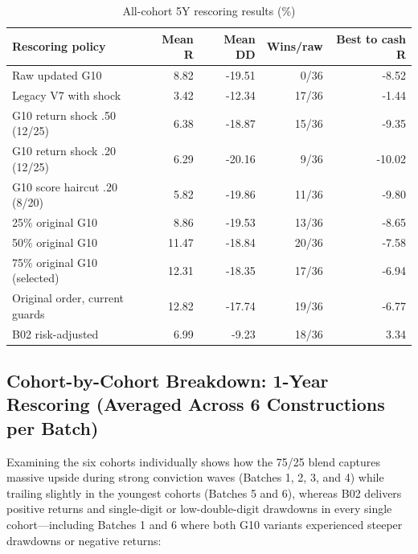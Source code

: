 \documentclass[11pt,a4paper]{article}
\numberwithin{table}{section}
\begin{document}
\begin{minipage}{\linewidth}
\begin{center}\small\setlength{\tabcolsep}{3pt}\renewcommand{\arraystretch}{1.18}
\begin{longtable}{@{}p{.43\linewidth}rrrr@{}}
\caption{All-cohort 5Y rescoring results (\%)}\\
\toprule
Rescoring policy & Mean R & Mean DD & Wins/raw & Best to cash R\\\midrule\endhead
Raw updated G10 & 8.82 & -19.51 & 0/36 & -8.52\\
Legacy V7 with shock & 3.42 & -12.34 & 17/36 & -1.44\\
G10 return shock .50 (12/25) & 6.38 & -18.87 & 15/36 & -9.35\\
G10 return shock .20 (12/25) & 6.29 & -20.16 & 9/36 & -10.02\\
G10 score haircut .20 (8/20) & 5.82 & -19.86 & 11/36 & -9.80\\
25\% original G10 & 8.86 & -19.53 & 13/36 & -8.65\\
50\% original G10 & 11.47 & -18.84 & 20/36 & -7.58\\
75\% original G10 (selected) & 12.31 & -18.35 & 17/36 & -6.94\\
Original order, current guards & 12.82 & -17.74 & 19/36 & -6.77\\
B02 risk-adjusted & 6.99 & -9.23 & 18/36 & 3.34\\
\bottomrule\end{longtable}\end{center}
\end{minipage}\par
\subsection{Cohort-by-Cohort Breakdown: 1-Year Rescoring (Averaged Across 6 Constructions per Batch)}

Examining the six cohorts individually shows how the 75/25 blend captures massive upside during strong conviction waves (Batches 1, 2, 3, and 4) while trailing slightly in the youngest cohorts (Batches 5 and 6), whereas B02 delivers positive returns and single-digit or low-double-digit drawdowns in every single cohort---including Batches 1 and 6 where both G10 variants experienced steeper drawdowns or negative returns:
\end{document}
